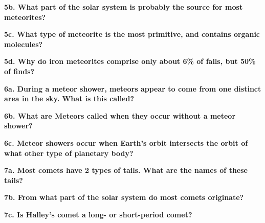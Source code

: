 \documentclass{report}
\begin{document}
    \bigbreak \noindent 
    \textbf{5b. What part of the solar system is probably the source for most meteorites? }
    \bigbreak \noindent 

    \bigbreak \noindent 
    \textbf{5c. What type of meteorite is the most primitive, and contains organic molecules?}
    \bigbreak \noindent 

    \bigbreak \noindent 
    \textbf{5d. Why do iron meteorites comprise only about 6\% of falls, but 50\% of finds?}
    \bigbreak \noindent 

    \bigbreak \noindent 
    \textbf{6a. During a meteor shower, meteors appear to come from one distinct area in the sky.
What is this called?}
    \bigbreak \noindent 

    \pagebreak \bigbreak \noindent 
    \textbf{6b. What are Meteors called when they occur without a meteor shower?}
    \bigbreak \noindent 

    \bigbreak \noindent 
    \textbf{6c. Meteor showers occur when Earth’s orbit intersects the orbit of what other type of
planetary body?}
    \bigbreak \noindent 

    \bigbreak \noindent 
    \textbf{7a. Most comets have 2 types of tails. What are the names of these tails?}
    \bigbreak \noindent 
    
    \bigbreak \noindent 
    \textbf{7b.  From what part of the solar system do most comets originate?}
    \bigbreak \noindent 

    \bigbreak \noindent 
    \textbf{7c.  Is Halley’s comet a long- or short-period comet? }
    \bigbreak \noindent 
\end{document}
